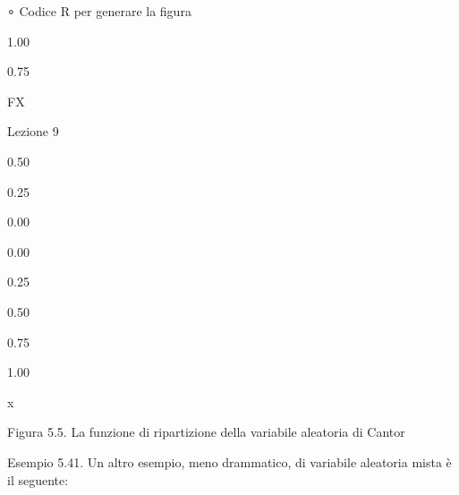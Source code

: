 \documentclass[a4paper,portrait,12pt]{article}
\begin{document}
\begin{flushleft}
∘ Codice R per generare la figura
\end{flushleft}


1.00





0.75





\begin{flushleft}
FX
\end{flushleft}





\begin{flushleft}
Lezione 9
\end{flushleft}





0.50





0.25





0.00


0.00





0.25





0.50





0.75





1.00





\begin{flushleft}
x
\end{flushleft}





\begin{flushleft}
Figura 5.5. La funzione di ripartizione della variabile aleatoria di Cantor
\end{flushleft}





\begin{flushleft}
Esempio 5.41. Un altro esempio, meno drammatico, di variabile aleatoria mista \`{e} il seguente:
\end{flushleft}
\end{document}

